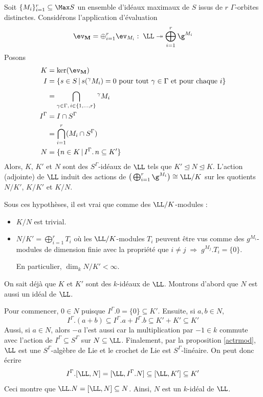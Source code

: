 \begin{Prop} \label{structureKab} Soit $\{M_i\}_{i=1}^r \subseteq \Max S$ un ensemble d'idéaux maximaux de $S$ issus de $r$ $\Gamma$-orbites distinctes. Considérons l'application d'évaluation 
$$ \ev_\mathbf{M} = \oplus_{i=1}^r \ev_{M_i} : \; \LL \twoheadrightarrow \bigoplus_{i=1}^r \g^{M_i} $$
Posons 
\begin{align*}
K &= \ker (\ev_\mathbf{M}) \\
I &= \{s \in S \, | \, s(^\gamma M_i) = 0 \text{ pour tout } \gamma \in \Gamma \text{ et pour chaque } i\} \\
&= \bigcap_{\gamma \in \Gamma, \, i \in \{1,...,r\}}^{\,} {}^\gamma M_i \\
I^\Gamma &= I \cap S^\Gamma \\
&= \bigcap_{i=1}^r (M_i \cap S^\Gamma) \\
N &= \{n \in K \, | \, I^\Gamma.\,n \subseteq K'\} 
\end{align*}
Alors, $K$, $K'$ et $N$ sont des $S^\Gamma$-idéaux de $\LL$ tels que $K' \unlhd N \unlhd K$. L'action (adjointe) de $\LL$ induit des actions de $\big(\bigoplus_{i=1}^r \g^{M_i}\big) \cong \LL / K$ sur les quotients $N/K'$, $K/K'$ et $K/N$. 

Sous ces hypothèses, il est vrai que comme des $\LL / K$-modules : 

\begin{itemize}
\item[\em(1)] $K/N$ est trivial.
\item[\em(2)] $N/K' = \bigoplus_{i=1}^r T_i$ o\`u les $\LL/K$-modules $T_i$ peuvent être vus comme des $g^{M_i}$-modules de dimension finie avec la propri\'et\'e que $i \neq j \; \Rightarrow \; g^{M_j}.T_i = \{0\}$.

En particulier, $ \dim_k N/K' < \infty$.
\end{itemize}
\begin{pre} On sait déjà que $K$ et $K'$ sont des $k$-idéaux de $\LL$. Montrons d'abord que $N$ est aussi un idéal de $\LL$.

Pour commencer, $0 \in N$ puisque $I^\Gamma.0 = \{0\} \subseteq K'$. Ensuite, si $a, b \in N$, 
$$ I^\Gamma.(a+b) \subseteq I^\Gamma.a + I^\Gamma.b \subseteq K' + K' \subseteq K' $$
Aussi, si $a \in N$, alors $-a$ l'est aussi car la multiplication par $-1 \in k$ commute avec l'action de $I^\Gamma \subseteq S^\Gamma$ sur $N \subseteq \LL$. Finalement, par la proposition \ref{actrmod}, $\LL$ est une $S^\Gamma$-algèbre de Lie et le crochet de Lie est $S^\Gamma$-linéaire. On peut donc écrire
$$ I^\Gamma.[\LL,N] = [\LL,I^\Gamma.N] \subseteq [\LL,K'] \subseteq K' $$
Ceci montre que $\LL.N = [\LL,N] \subseteq N$. Ainsi, $N$ est un $k$-idéal de $\LL$.


\end{pre}
\end{Prop}
